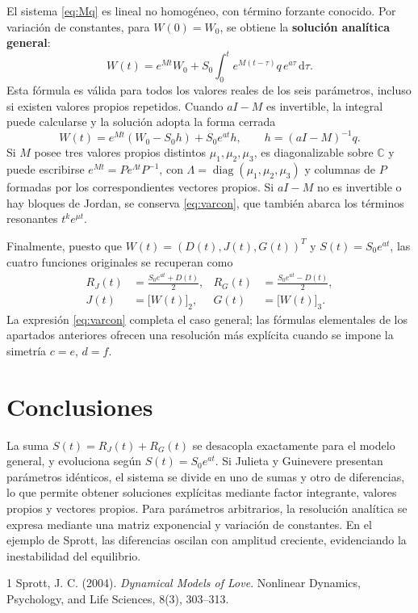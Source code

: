 \documentclass[10pt,letterpaper]{article}
\newcommand{\RJ}{R_{J}}
\newcommand{\RG}{R_{G}}
\newcommand{\dd}{\mathrm{d}}
\begin{document}
El sistema \eqref{eq:Mq} es lineal no homogéneo, con término forzante conocido. Por variación de constantes, para $W(0)=W_0$, se obtiene la \textbf{solución analítica general}:
\begin{equation}\label{eq:varcon}
\boxed{W(t)=e^{Mt}W_0+S_0\int_0^t e^{M(t-\tau)}q\,e^{a\tau}\,\dd\tau.}
\end{equation}
Esta fórmula es válida para todos los valores reales de los seis parámetros, incluso si existen valores propios repetidos. Cuando $aI-M$ es invertible, la integral puede calcularse y la solución adopta la forma cerrada
\begin{equation}\label{eq:closedgen}
\boxed{W(t)=e^{Mt}(W_0-S_0h)+S_0e^{at}h,
\qquad h=(aI-M)^{-1}q.}
\end{equation}
Si $M$ posee tres valores propios distintos $\mu_1,\mu_2,\mu_3$, es diagonalizable sobre $\mathbb C$ y puede escribirse $e^{Mt}=Pe^{\Lambda t}P^{-1}$, con $\Lambda=\operatorname{diag}(\mu_1,\mu_2,\mu_3)$ y columnas de $P$ formadas por los correspondientes vectores propios. Si $aI-M$ no es invertible o hay bloques de Jordan, se conserva \eqref{eq:varcon}, que también abarca los términos resonantes $t^ke^{\mu t}$.

Finalmente, puesto que $W(t)=(D(t),J(t),G(t))^T$ y $S(t)=S_0e^{at}$, las cuatro funciones originales se recuperan como
\begin{equation}\label{eq:rec_final}
\boxed{\begin{aligned}
\RJ(t)&=\frac{S_0e^{at}+D(t)}2,&
\RG(t)&=\frac{S_0e^{at}-D(t)}2,\\
J(t)&=\bigl[W(t)\bigr]_2,&
G(t)&=\bigl[W(t)\bigr]_3.
\end{aligned}}
\end{equation}
La expresión \eqref{eq:varcon} completa el caso general; las fórmulas elementales de los apartados anteriores ofrecen una resolución más explícita cuando se impone la simetría $c=e$, $d=f$.

\section*{Conclusiones}
La suma $S(t)=\RJ(t)+\RG(t)$ se desacopla exactamente para el modelo general, y evoluciona según $S(t)=S_0e^{at}$. Si Julieta y Guinevere presentan parámetros idénticos, el sistema se divide en uno de sumas y otro de diferencias, lo que permite obtener soluciones explícitas mediante factor integrante, valores propios y vectores propios. Para parámetros arbitrarios, la resolución analítica se expresa mediante una matriz exponencial y variación de constantes. En el ejemplo de Sprott, las diferencias oscilan con amplitud creciente, evidenciando la inestabilidad del equilibrio.

\begin{thebibliography}{1}
Sprott, J. C. (2004). \emph{Dynamical Models of Love}. Nonlinear Dynamics, Psychology, and Life Sciences, 8(3), 303--313.
\end{thebibliography}
\end{document}
